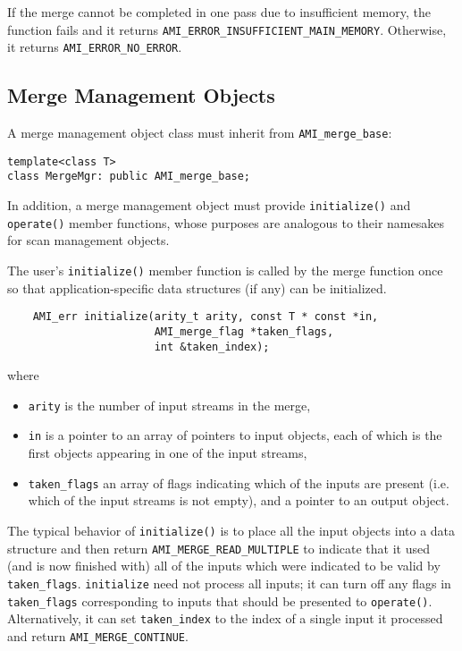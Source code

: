 If the merge cannot be completed in one pass due to insufficient
memory, the function fails and it returns
\lstinline|AMI_ERROR_INSUFFICIENT_MAIN_MEMORY|. Otherwise, it returns
\lstinline|AMI_ERROR_NO_ERROR|.



\subsection{Merge Management Objects}\label{ssec:mmo}

A merge management object class must inherit from
\lstinline|AMI_merge_base|:
\begin{lstlisting}
template<class T>
class MergeMgr: public AMI_merge_base;
\end{lstlisting}
In addition, a merge management object must provide
\lstinline|initialize()| and \lstinline|operate()| member functions,
whose purposes are analogous to their namesakes for scan management
objects.

 The user's
\lstinline|initialize()| member function is called by the merge
function once so that application-specific data structures (if any)
can be initialized.
\begin{lstlisting}
    AMI_err initialize(arity_t arity, const T * const *in,
                       AMI_merge_flag *taken_flags,
                       int &taken_index);
\end{lstlisting}
 
where
    \begin{itemize}
    \item \lstinline|arity| is the number of input streams in the
      merge,
      \item \lstinline|in| is a pointer to an array of pointers to
        input objects, each of which is the first objects appearing in
        one of the input streams,
      \item \lstinline|taken_flags| an array of flags indicating which
        of the inputs are present (i.e.  which of the input streams is
        not empty), and a pointer to an output object.
    \end{itemize}
    
    The typical behavior of \lstinline|initialize()| is to place all
    the input objects into a data structure and then return
    \lstinline|AMI_MERGE_READ_MULTIPLE| to indicate that it used (and
    is now finished with) all of the inputs which were indicated to be
    valid by \lstinline|taken_flags|.  \lstinline|initialize| need not
    process all inputs; it can turn off any flags in
    \lstinline|taken_flags| corresponding to inputs that should be
    presented to \lstinline|operate()|.  Alternatively, it can set
    \lstinline|taken_index| to the index of a single input it
    processed and return \lstinline|AMI_MERGE_CONTINUE|.
    
